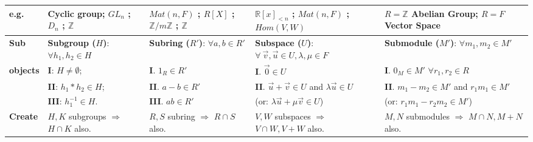 \documentclass[9pt]{article}
\begin{document}
{\begin{longtable}{l@{\hskip 2pt}||l|l|l|l}
    \hline
    \textbf{\tiny e.g.}  & Cyclic group; $GL_n$ ; $D_n$ ; $\mathbb{Z}$                                   & $Mat(n,F)$ ; $R[X]$ ; $\mathbb{Z}/m\mathbb{Z}$ ; $\mathbb{Z}$                      & $\mathbb{R}[x]_{<n}$ ; $Mat(n,F)$ ; $Hom(V,W)$                                                                             & {\tiny $R=\mathbb{Z}$ Abelian Group; $R=F$ Vector Space}                                  \\
    \hline
    \hline
    \textbf{\tiny Sub}     & \textbf{Subgroup ($H$)}: \hfill{\tiny $\forall h_1,h_2\in H$}               & \textbf{Subring ($R'$)}: \hfill{\tiny $\forall a,b\in R'$}                         & \textbf{Subspace ($U$)}: \hfill{\tiny $\forall \ \vec{v},\vec{u}\in U,\lambda,\mu\in F$}                                   & \textbf{Submodule ($M'$)}: \hfill{\tiny $\forall m_1,m_2\in M'$}                          \\
    \textbf{\tiny objects} & \textbf{I}: $H\ne\emptyset$;                                                & \textbf{I}. $1_R\in R'$                                                            & \textbf{I}. $\vec{0}\in U$                                                                                                 & \textbf{I}. $0_M\in M'$ \hfill{\tiny $\forall r_1,r_2\in R$}                              \\
                           & \textbf{II}: $h_1*h_2\in H$;                                                & \textbf{II}. $a-b\in R'$                                                           & \textbf{II}. $\vec{u}+\vec{v}\in U$ and $\lambda\vec{u}\in U$                                                              & \textbf{II}. $m_1-m_2\in M'$ and $r_1m_1\in M'$                                           \\
                           & \textbf{III}: $h_1^{-1}\in H$.                                              & \textbf{III}. $ab\in R'$                                                           & \qquad \quad (or: $\lambda\vec{u}+\mu\vec{v}\in U$)                                                                        & \qquad \quad (or: $r_1m_1-r_2m_2\in M'$)                                                  \\
    \hline
    \textbf{\tiny Create}  & $H,K$ subgroups $\Rightarrow$ $H\cap K$ also.                               & $R,S$ subring $\Rightarrow$ $R\cap S$ also.                                        & $V,W$ subspaces $\Rightarrow$ $V\cap W,V+W$ also.                                                                          & $M,N$ submodules $\Rightarrow$ $M\cap N,M+N$ also.\\

\end{longtable}}
\end{document}
